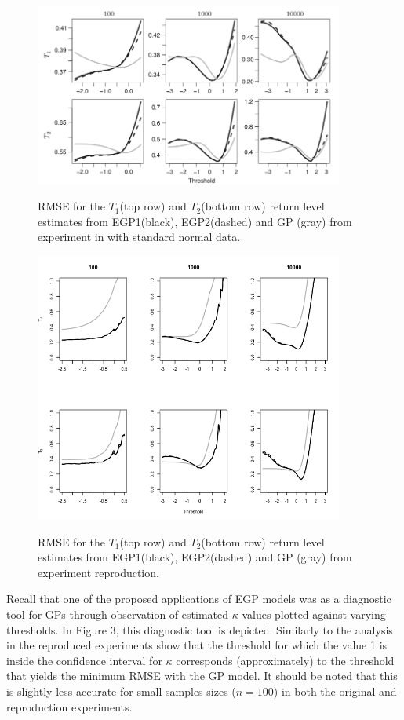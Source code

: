 \documentclass[12pt]{article}
\theoremstyle{definition}
\theoremstyle{definition}
\begin{document}
\begin{figure}[H]
\begin{center}
{\includegraphics[width=4.0in]{project/papafiles/fig2.papa.png}}
\caption{RMSE for the $T_1$(top row) and $T_2$(bottom row) return level estimates from EGP1(black), EGP2(dashed) and GP (gray) from experiment in \cite{papatawn} with standard normal data.}
\end{center}
\end{figure}
\begin{figure}[H]
\begin{center}
{\includegraphics[width=4.0in]{project/papafiles/fig2.me.png}}
\caption{RMSE for the $T_1$(top row) and $T_2$(bottom row) return level estimates from EGP1(black), EGP2(dashed) and GP (gray) from experiment reproduction.}
\end{center}
\end{figure}
Recall that one of the proposed applications of EGP models was as a diagnostic tool for GPs through observation of estimated $\kappa$ values plotted against varying thresholds. In Figure 3, this diagnostic tool is depicted. Similarly to the analysis in \cite{papatawn} the reproduced experiments show that the threshold for which the value 1 is inside the confidence interval for $\kappa$ corresponds (approximately) to the threshold that yields the minimum RMSE with the GP model. It should be noted that this is slightly less accurate for small samples sizes ($n=100$) in both the original and reproduction experiments.
\end{document}
